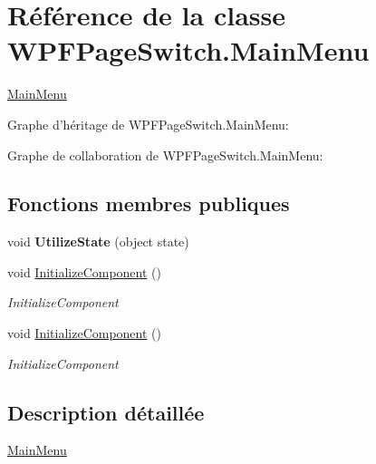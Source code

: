 \hypertarget{class_w_p_f_page_switch_1_1_main_menu}{\section{Référence de la classe W\+P\+F\+Page\+Switch.\+Main\+Menu}
\label{class_w_p_f_page_switch_1_1_main_menu}
}


\hyperlink{class_w_p_f_page_switch_1_1_main_menu}{Main\+Menu}  




Graphe d'héritage de W\+P\+F\+Page\+Switch.\+Main\+Menu\+:


Graphe de collaboration de W\+P\+F\+Page\+Switch.\+Main\+Menu\+:
\subsection*{Fonctions membres publiques}
\begin{DoxyCompactItemize}
\item 
\hypertarget{class_w_p_f_page_switch_1_1_main_menu_a6336501f31a0346a54b4b8f92c69e823}{void {\bfseries Utilize\+State} (object state)}\label{class_w_p_f_page_switch_1_1_main_menu_a6336501f31a0346a54b4b8f92c69e823}

\item 
void \hyperlink{class_w_p_f_page_switch_1_1_main_menu_ad8e328850b1e3d831ba78fc7317acee5}{Initialize\+Component} ()
\begin{DoxyCompactList}\small\item\em Initialize\+Component \end{DoxyCompactList}\item 
void \hyperlink{class_w_p_f_page_switch_1_1_main_menu_ad8e328850b1e3d831ba78fc7317acee5}{Initialize\+Component} ()
\begin{DoxyCompactList}\small\item\em Initialize\+Component \end{DoxyCompactList}\end{DoxyCompactItemize}


\subsection{Description détaillée}
\hyperlink{class_w_p_f_page_switch_1_1_main_menu}{Main\+Menu} 



